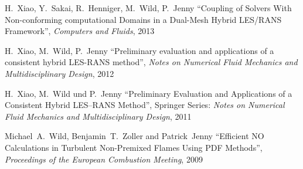 \documentclass[line,11pt,a4paper]{resume}
\begin{document}
\begin{resume}
\vspace{-3mm}
H.~Xiao, Y.~Sakai, R.~Henniger, M.~Wild, P.~Jenny
``Coupling of Solvers With Non-conforming computational Domains in a Dual-Mesh
Hybrid LES/RANS Framework'', \textsl{Computers and Fluids}, 2013

\vspace{-3mm}
H.~Xiao, M.~Wild, P.~Jenny
``Preliminary evaluation and applications of a consistent hybrid LES-RANS
method'', \textsl{Notes on Numerical Fluid Mechanics and Multidisciplinary
Design}, 2012

\vspace{-3mm}
H.~Xiao, M.~Wild und P.~Jenny ``Preliminary Evaluation and
Applications of a Consistent Hybrid LES--RANS Method'', Springer Series:
\textsl{Notes on Numerical Fluid Mechanics and Multidisciplinary Design}, 2011

\vspace{-3mm}
Michael~A.~Wild, Benjamin~T.~Zoller and Patrick~Jenny
``Efficient NO Calculations in Turbulent Non-Premixed Flames Using
PDF Methods'', \textsl{Proceedings of the European Combustion Meeting}, 2009



\end{resume}
\end{document}
